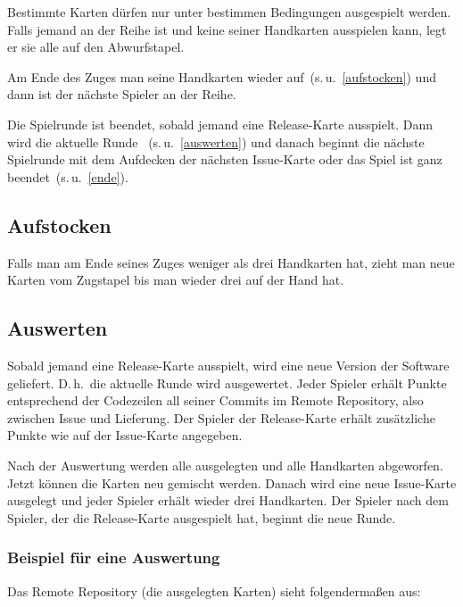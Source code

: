 \documentclass[DIV=15, fontsize=11pt]{gitgame}
\begin{document}
Bestimmte Karten dürfen nur unter bestimmen Bedingungen ausgespielt werden. Falls jemand an der Reihe ist und keine seiner Handkarten ausspielen kann, legt er sie alle auf den Abwurfstapel.

Am Ende des Zuges  man seine Handkarten wieder auf~(s.\,u.~\ref{aufstocken}) und dann ist der nächste Spieler an der Reihe.

Die Spielrunde ist beendet, sobald jemand eine Release-Karte ausspielt. Dann wird die aktuelle Runde ~(s.\,u.~\ref{auswerten}) und danach beginnt die nächste Spielrunde mit dem Aufdecken der nächsten Issue-Karte oder das Spiel ist ganz beendet~(s.\,u.~\ref{ende}).


\subsection{Aufstocken\label{aufstocken}}
Falls man am Ende seines Zuges weniger als drei Handkarten hat, zieht man neue Karten vom Zugstapel bis man wieder drei auf der Hand hat.


\subsection{Auswerten\label{auswerten}}
Sobald jemand eine Release-Karte ausspielt, wird eine neue Version der Software geliefert. D.\,h.\ die aktuelle Runde wird ausgewertet. Jeder Spieler erhält Punkte entsprechend der Codezeilen all seiner Commits im Remote Repository, also zwischen Issue und Lieferung. Der Spieler der Release-Karte erhält zusätzliche Punkte wie auf der Issue-Karte angegeben.

Nach der Auswertung werden alle ausgelegten und alle Handkarten abgeworfen. Jetzt können die Karten neu gemischt werden. Danach wird eine neue Issue-Karte ausgelegt und jeder Spieler erhält wieder drei Handkarten. Der Spieler nach dem Spieler, der die Release-Karte ausgespielt hat, beginnt die neue Runde.


\subsubsection*{Beispiel für eine Auswertung}
Das Remote Repository (die ausgelegten Karten) sieht folgendermaßen aus:

\begin{center}
\end{center}
\end{document}
